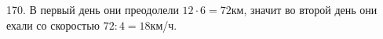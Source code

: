 170. В первый день они преодолели $12\cdot6=72$км, значит во второй день они ехали со скоростью $72:4=18$км/ч.\\
